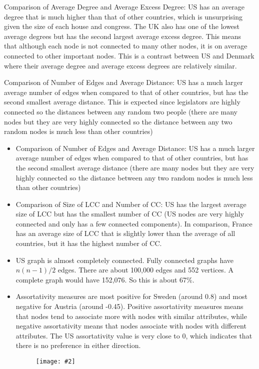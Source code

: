 \documentclass[12pt]{article}
\newcommand{\image}[4][0.6]{
  \begin{figure}[H]
    \centering
    \texttt{[image: \#2]}
    \begin{center}
      \caption[(details)]{\textbf{#4}}
    \end{center}
    \vspace{-2em}
    \label{fig:#2}
  \end{figure}}
\begin{document}
\begin{multicols*}{2}
Comparison of Average Degree and Average Excess Degree: US has an average degree that is much higher than that of other countries, which is unsurprising given the size of each house and congress. The UK also has one of the lowest average degrees but has the second largest average excess degree. This means that although each node is not connected to many other nodes, it is on average connected to other important nodes. This is a contrast between US and Denmark where their average degree and average excess degrees are relatively similar. 

Comparison of Number of Edges and Average Distance: US has a much larger average number of edges when compared to that of other countries, but has the second smallest average distance. This is expected since legislators are highly connected so the distances between any random two people   (there are many nodes but they are very highly connected so the distance between any two random nodes is much less than other countries)

\begin{itemize}
  \item Comparison of Number of Edges and Average Distance: US has a much larger average number of edges when compared to that of other countries, but has the second smallest average distance (there are many nodes but they are very highly connected so the distance between any two random nodes is much less than other countries)
  \item Comparison of Size of LCC and Number of CC: US has the largest average size of LCC but has the smallest number of CC (US nodes are very highly connected and only has a few connected components). In comparison, France has an average size of LCC that is slightly lower than the average of all countries, but it has the highest number of CC.
  \item US graph is almost completely connected. Fully connected graphs have $n(n-1)/2$ edges. There are about 100,000 edges and 552 vertices. A complete graph would have 152,076. So this is about 67\%.
  \item Assortativity measures are most positive for  Sweden (around 0.8) and most negative for Austria (around -0.45). Positive assortativity measures means that nodes tend to associate more with nodes with similar attributes, while negative assortativity means that nodes associate with nodes with different attributes. The US assortativity value is very close to 0, which indicates that there is no preference in either direction. 
  \image[0.3]{../plots/assortativity/all_countries.png}{}{}{}
\end{itemize}



\end{multicols*}
\end{document}
